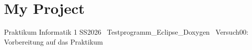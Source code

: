 \chapter{My Project}
\hypertarget{index}{}\label{index}
Praktikum Informatik 1 SS2026~\newline
Testprogramm\+\_\+\+Eclipse\+\_\+\+Doxygen~\newline
Versuch00\+: Vorbereitung auf das Praktikum 